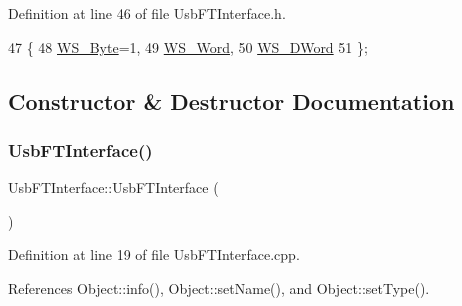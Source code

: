 Definition at line 46 of file Usb\+F\+T\+Interface.\+h.


\begin{DoxyCode}
47     \{
48       \hyperlink{classUsbFTInterface_a057387f452eaac094fb77ba09cf1cf2ea32efe2feb6728578134aa9b85b97d1b9}{WS\_Byte}=1,
49       \hyperlink{classUsbFTInterface_a057387f452eaac094fb77ba09cf1cf2ea83a39aef091bbcfb420ac32aafe55e0a}{WS\_Word},
50       \hyperlink{classUsbFTInterface_a057387f452eaac094fb77ba09cf1cf2eae8012559bbaaae91ac6208ed7b3ffe89}{WS\_DWord}
51     \};
\end{DoxyCode}


\subsection{Constructor \& Destructor Documentation}
\mbox{\label{classUsbFTInterface_aa0f871007821694c3e1f53f65cea8af4}} 
\subsubsection{\texorpdfstring{Usb\+F\+T\+Interface()}{UsbFTInterface()}}
{\footnotesize\ttfamily Usb\+F\+T\+Interface\+::\+Usb\+F\+T\+Interface (\begin{DoxyParamCaption}{ }\end{DoxyParamCaption})}



Definition at line 19 of file Usb\+F\+T\+Interface.\+cpp.



References Object\+::info(), Object\+::set\+Name(), and Object\+::set\+Type().


